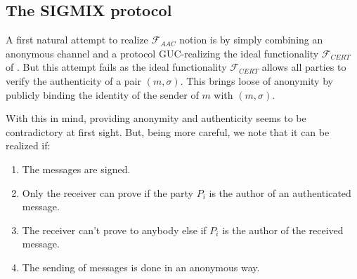 \documentclass{acm_proc_article-sp}
\begin{document}
\subsection{The SIGMIX protocol}
A first natural attempt to realize $\mathcal{F}_{AAC}$ notion is by simply combining an anonymous
channel and a protocol GUC-realizing the ideal functionality $\mathcal{F}_{CERT}$ of \cite{conf/csfw/Canetti04}.
But this attempt fails as the ideal functionality $\mathcal{F}_{CERT}$ allows all parties to verify the authenticity
of a pair $(m, \sigma)$. This brings loose of anonymity by publicly binding the identity of the sender of $m$ with
$(m, \sigma)$.

With this in mind, providing anonymity and authenticity seems to be contradictory at first sight.
But, being more careful, we note that it can be realized if:
\begin{enumerate}
    \item The messages are signed.
    \item Only the receiver can prove if the party $P_i$  is the author of an authenticated message.
    \item The receiver can't prove to anybody else if $P_i$ is the author of the received message.
    \item The sending of messages is done in an anonymous way.
\end{enumerate}
\end{document}
